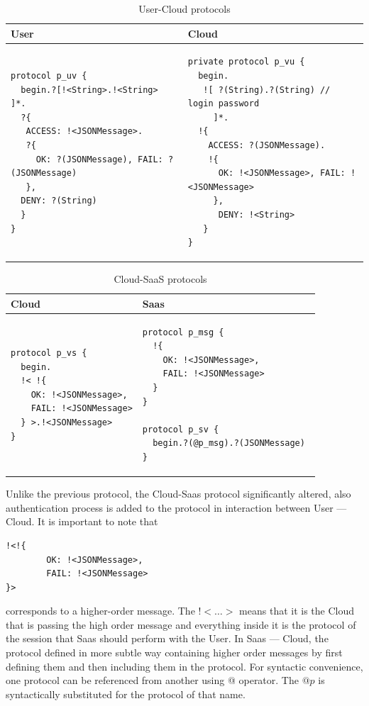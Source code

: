 \documentclass[a4paper]{easychair}
\begin{document}
{
\lstset{
framerule=0pt,
numbers=none
}
\begin{longtable}{|p{}|p{}|}
\caption{User-Cloud protocols}\label{tab:user-cloud-protocol} \\ \hline
User & Cloud \\ \hline \endhead
\begin{lstlisting}
protocol p_uv { 
  begin.?[!<String>.!<String> ]*.
  ?{
   ACCESS: !<JSONMessage>.
   ?{
     OK: ?(JSONMessage), FAIL: ?(JSONMessage)
   },
  DENY: ?(String)
  } 
}
\end{lstlisting}
&
\begin{lstlisting}
private protocol p_vu { 
  begin.
   ![ ?(String).?(String) // login password
     ]*.
  !{
    ACCESS: ?(JSONMessage).
    !{
      OK: !<JSONMessage>, FAIL: !<JSONMessage>
     },
      DENY: !<String>
   } 
}
\end{lstlisting}
\\ \hline
\end{longtable}
}



{
\lstset{
framerule=0pt,
numbers=none
}
\begin{longtable}{|p{}|p{}|}
\caption{Cloud-SaaS protocols}\label{tab:cloud-saas-providers} \\ \hline
Cloud & Saas \\ \hline \endhead
\begin{lstlisting}
protocol p_vs {
  begin.
  !< !{
    OK: !<JSONMessage>, 
    FAIL: !<JSONMessage>
  } >.!<JSONMessage>    
}
\end{lstlisting}
&
\begin{lstlisting}
protocol p_msg { 
  !{
    OK: !<JSONMessage>,
    FAIL: !<JSONMessage> 
  }
}

protocol p_sv {
  begin.?(@p_msg).?(JSONMessage) 
}
\end{lstlisting}
\\ \hline
\end{longtable}
}

Unlike the previous protocol, the Cloud-Saas protocol significantly altered, also authentication process is added to the protocol in interaction between User --- Cloud. It is important to note that 

\begin{lstlisting}
!<!{
        OK: !<JSONMessage>,
        FAIL: !<JSONMessage> 
}>
\end{lstlisting}

corresponds to a higher-order message. The !$<\dots>$ means that it is the Cloud that is passing the high order message and everything inside it is the protocol of the session that Saas should perform with the User. In Saas --- Cloud, the protocol defined in more subtle way containing higher order messages by first defining them and then including them in the protocol. For syntactic convenience, one protocol can be referenced from another using @ operator. The $@p$ is syntactically substituted for the protocol of that name.
\end{document}
